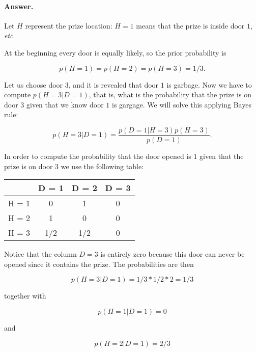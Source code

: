 \documentclass[12pt]{article}
\begin{document}
\paragraph{Answer.}
Let $H$ represent the prize location: $H = 1$ means that the prize is inside door $1$, \textit{etc}.

At the beginning every door is equally likely, so the prior probability is

\begin{equation}
p(H = 1) = p (H = 2) = p (H = 3 ) = 1/3.
\end{equation}

Let us choose door $3$, and it is revealed that door $1$ is garbage.
Now we have to compute $p ( H = 3 | D = 1 )$, that is,
what is the probability that the prize is on door $3$ given that we know 
door $1$ is gargage.
We will solve this applying Bayes rule:

\begin{equation}
p ( H = 3 | D = 1 ) = \frac{ p ( D = 1 | H = 3 ) p ( H = 3 ) }{ p ( D = 1 ) }.
\end{equation}

In order to compute the probability that the door opened is $1$ given that the prize is on door $3$ we
use the following table:

\begin{center}
\begin{tabular}{| c | c | c | c |}
\hline
& D = 1 & D = 2 & D = 3 \\
\hline
H = 1 & 0 & 1 & 0 \\
\hline 
H = 2 & 1 & 0 & 0 \\
\hline
H = 3 & 1/2 & 1/2 & 0 \\
\hline
\end{tabular}
\end{center}

\noindent
Notice that the column $D = 3$ is entirely zero because this door can never be opened since it contains the prize.
The probabilities are then

\begin{equation}
p ( H = 3 | D = 1 ) =  1/3 * 1/2 * 2 = 1/3
\end{equation}

\noindent
together with

\begin{equation}
p ( H = 1 | D = 1 ) = 0
\end{equation}

\noindent
and

\begin{equation}
p ( H = 2 | D = 1 ) = 2/3
\end{equation}
\end{document}
